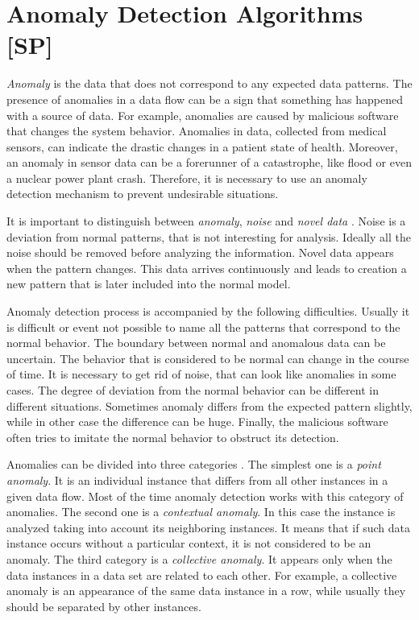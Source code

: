 \section{Anomaly Detection Algorithms [SP]}

\textit{Anomaly} is the data that does not correspond to any expected data patterns.
The presence of anomalies in a data flow can be a sign that something has happened with a source of data.
For example, anomalies are caused by malicious software that changes the system behavior. 
Anomalies in data, collected from medical sensors, can indicate the drastic changes in a patient state of health.
Moreover, an anomaly in sensor data can be a forerunner of a catastrophe, like flood or even a nuclear power plant crash.
Therefore, it is necessary to use an anomaly detection mechanism to prevent undesirable situations.

It is important to distinguish between \textit{anomaly}, \textit{noise} and \textit{novel data} \cite{Chandola2007}.
Noise is a deviation from normal patterns, that is not interesting for analysis.
Ideally all the noise should be removed before analyzing the information.
Novel data appears when the pattern changes.
This data arrives continuously and leads to creation a new pattern that is later included into the normal model.  

Anomaly detection process is accompanied by the following difficulties.
Usually it is difficult or event not possible to name all the patterns that correspond to the normal behavior.
The boundary between normal and anomalous data can be uncertain.
The behavior that is considered to be normal can change in the course of time.
It is necessary to get rid of noise, that can look like anomalies in some cases.
The degree of deviation from the normal behavior can be different in different situations.
Sometimes anomaly differs from the expected pattern slightly, while in other case the difference can be huge.
Finally, the malicious software often tries to imitate the normal behavior to obstruct its detection. 

Anomalies can be divided into three categories \cite{Chandola2007}.
The simplest one is a \textit{point anomaly}.
It is an individual instance that differs from all other instances in a given data flow.
Most of the time anomaly detection works with this category of anomalies.
The second one is a \textit{contextual anomaly}.
In this case the instance is analyzed taking into account its neighboring instances.
It means that if such data instance occurs without a particular context, it is not considered to be an anomaly.
The third category is a \textit{collective anomaly}.
It appears only when the data instances in a data set are related to each other.
For example, a collective anomaly is an appearance of the same data instance in a row, while usually they should be separated by other instances.

